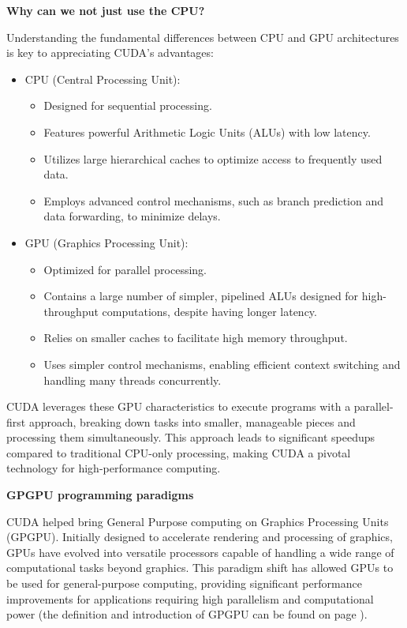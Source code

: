 \highspace
\begin{flushleft}
    \textcolor{Green3}{ \textbf{Why can we not just use the CPU?}}
\end{flushleft}
Understanding the fundamental differences between CPU and GPU architectures is key to appreciating CUDA's advantages:
\begin{itemize}
    \item CPU (Central Processing Unit):
    \begin{itemize}
        \item Designed for sequential processing.
        \item Features powerful Arithmetic Logic Units (ALUs) with low latency.
        \item Utilizes large hierarchical caches to optimize access to frequently used data.
        \item Employs advanced control mechanisms, such as branch prediction and data forwarding, to minimize delays.
    \end{itemize}

    \item GPU (Graphics Processing Unit):
    \begin{itemize}
        \item Optimized for parallel processing.
        \item Contains a large number of simpler, pipelined ALUs designed for high-throughput computations, despite having longer latency.
        \item Relies on smaller caches to facilitate high memory throughput.
        \item Uses simpler control mechanisms, enabling efficient context switching and handling many threads concurrently.
    \end{itemize}
\end{itemize}
CUDA leverages these GPU characteristics to execute programs with a parallel-first approach, breaking down tasks into smaller, manageable pieces and processing them simultaneously. This approach leads to significant speedups compared to traditional CPU-only processing, making CUDA a pivotal technology for high-performance computing.

\newpage

\begin{flushleft}
    \textcolor{Green3}{ \textbf{GPGPU programming paradigms}}
\end{flushleft}
CUDA helped bring General Purpose computing on Graphics Processing Units (GPGPU). Initially designed to accelerate rendering and processing of graphics, GPUs have evolved into versatile processors capable of handling a wide range of computational tasks beyond graphics. This paradigm shift has allowed GPUs to be used for general-purpose computing, providing significant performance improvements for applications requiring high parallelism and computational power (the definition and introduction of GPGPU can be found on page \pageref{def: General-Purpose computing on Graphics Processing Units (GPGPU)}).

